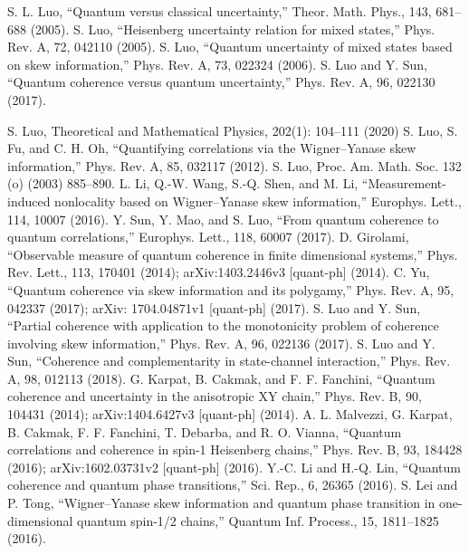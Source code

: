 \begin{thebibliography}{}
 S. L. Luo, “Quantum versus classical uncertainty,” Theor. Math. Phys., 143, 681–688 (2005).
 S. Luo, “Heisenberg uncertainty relation for mixed states,” Phys. Rev. A, 72, 042110 (2005).
 S. Luo, “Quantum uncertainty of mixed states based on skew information,” Phys. Rev. A, 73, 022324 (2006).
 S. Luo and Y. Sun, “Quantum coherence versus quantum uncertainty,” Phys. Rev. A, 96, 022130 (2017).

 S. Luo, Theoretical and Mathematical Physics, 202(1): 104–111 (2020)
 S. Luo, S. Fu, and C. H. Oh, “Quantifying correlations via the Wigner–Yanase skew information,” Phys. Rev. A,
85, 032117 (2012).
 S. Luo, Proc. Am. Math. Soc. 132 (o) (2003) 885–890.
 L. Li, Q.-W. Wang, S.-Q. Shen, and M. Li, “Measurement-induced nonlocality based on Wigner–Yanase skew
information,” Europhys. Lett., 114, 10007 (2016).
 Y. Sun, Y. Mao, and S. Luo, “From quantum coherence to quantum correlations,” Europhys. Lett., 118, 60007
(2017).
 D. Girolami, “Observable measure of quantum coherence in finite dimensional systems,” Phys. Rev. Lett., 113,
170401 (2014); arXiv:1403.2446v3 [quant-ph] (2014).
 C. Yu, “Quantum coherence via skew information and its polygamy,” Phys. Rev. A, 95, 042337 (2017); arXiv:
1704.04871v1 [quant-ph] (2017).
 S. Luo and Y. Sun, “Partial coherence with application to the monotonicity problem of coherence involving skew
information,” Phys. Rev. A, 96, 022136 (2017).
 S. Luo and Y. Sun, “Coherence and complementarity in state-channel interaction,” Phys. Rev. A, 98, 012113
(2018).
 G. Karpat, B. Cakmak, and F. F. Fanchini, “Quantum coherence and uncertainty in the anisotropic XY chain,”
Phys. Rev. B, 90, 104431 (2014); arXiv:1404.6427v3 [quant-ph] (2014).
 A. L. Malvezzi, G. Karpat, B. Cakmak, F. F. Fanchini, T. Debarba, and R. O. Vianna, “Quantum correlations and coherence in spin-1 Heisenberg chains,” Phys. Rev. B, 93, 184428 (2016); arXiv:1602.03731v2 [quant-ph] (2016).
 Y.-C. Li and H.-Q. Lin, “Quantum coherence and quantum phase transitions,” Sci. Rep., 6, 26365 (2016).
 S. Lei and P. Tong, “Wigner–Yanase skew information and quantum phase transition in one-dimensional quantum spin-1/2 chains,” Quantum Inf. Process., 15, 1811–1825 (2016).

\end{thebibliography}
